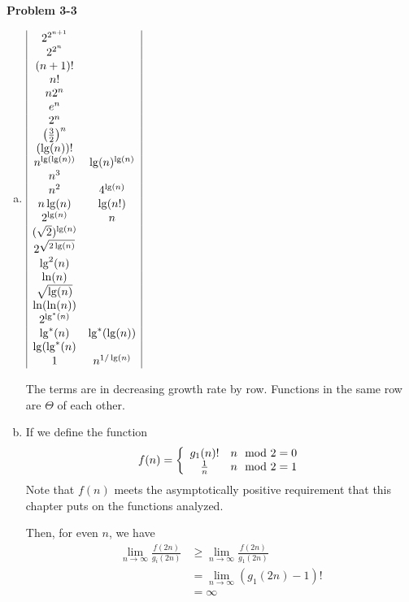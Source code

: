\documentclass{article}
\begin{document}
\noindent\textbf{Problem 3-3}\\
\begin{enumerate}[a.]
\item
$
\begin{array}{|c c|}
2^{2^{n+1}}&\\
2^{2^n}&\\
(n+1)!&\\
n!&\\
n2^n&\\
e^n&\\
2^n&\\
\left(\frac{3}{2}\right)^n&\\
(\lg(n))!&\\
 n^{\lg(\lg(n))}&\lg(n)^{\lg(n)}\\
 n^3&\\
  n^2& 4^{\lg(n)}\\
  n\lg(n)&\lg(n!)\\
  2^{\lg(n)}&n\\
  (\sqrt{2})^{\lg(n)}&\\
  2^{\sqrt{2\lg(n)}}&\\
  \lg^2(n)&\\
  \ln(n)&\\
  \sqrt{\lg(n)}&\\
  \ln(\ln(n))&\\
  2^{\lg^*(n)}&\\
  \lg^*(n) &\lg^*(\lg(n))\\
  \lg(\lg^*(n)&\\
  1&n^{1/\lg(n)}

\end{array}
$


The terms are in decreasing growth rate by row. Functions in the same row are $\Theta$ of each other.
\item
If we define the function
\[
f(n) = \left\{\begin{array}{c c}g_1(n)!& n\mod 2=0 \\ \frac{1}{n} &n\mod 2 =1\end{array}\right.
\]
Note that $f(n)$ meets the asymptotically positive requirement that this chapter puts on the functions analyzed.

Then, for even $n$, we have
\begin{align*}
\lim_{n\rightarrow\infty} \frac{f(2n)}{g_i(2n)} &\ge \lim_{n\rightarrow\infty} \frac{f(2n)}{g_1(2n)}\\
&= \lim_{n\rightarrow\infty} (g_1(2n) -1)!\\
&=\infty
\end{align*}


\end{enumerate}
\end{document}
